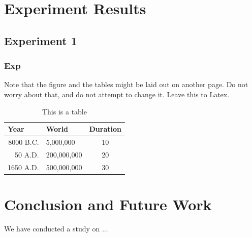 \documentclass{svproc}
\begin{document}
\section{Experiment Results}
    \subsection{Experiment 1}
        \subsubsection{Exp}
    Note that the figure and the tables might be laid out on another page. Do not worry about that, and do not attempt to change it. Leave this to Latex.
    
    
    \begin{table}
        \caption{This is a table}
        \begin{center}
            \begin{tabular}{rlc}
                \hline
                \multicolumn{1}{l}{Year}&\multicolumn{1}{l}{World}&\multicolumn{1}{l}{Duration}\\
                \hline
                8000 B.C.  &     5,000,000 &  10\\
                  50 A.D.  &   200,000,000 &  20\\
                1650 A.D.  &   500,000,000 &  30\\
                \hline
            \end{tabular}
        \end{center}
    \end{table}

\section{Conclusion and Future Work}
We have conducted a study on ...

\printbibliography 
\end{document}
